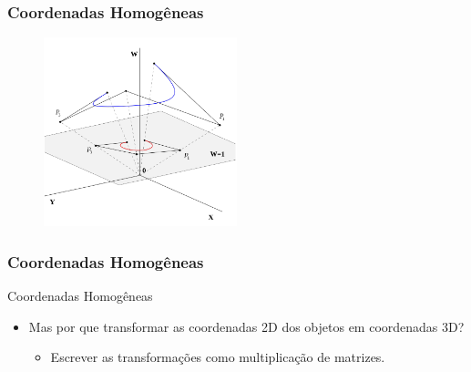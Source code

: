 \documentclass{beamer}
\begin{document}

\begin{frame}
\frametitle{Coordenadas Homogêneas}
\begin{figure}[!h]
		\begin{center}
			\includegraphics[width=0.5\textwidth]{Figures/coohomo}
		\end{center}
	\end{figure}
\end{frame}


\begin{frame}
\frametitle{Coordenadas Homogêneas}
	\begin{block}{Coordenadas Homogêneas}
		\begin{itemize}
			\item Mas por que transformar as coordenadas 2D dos objetos em coordenadas 3D?
				\begin{itemize}
					\item<2-> Escrever as transformações como multiplicação de matrizes. 
				\end{itemize}	
		\end{itemize}
	\end{block}

\end{frame}

\end{document}
